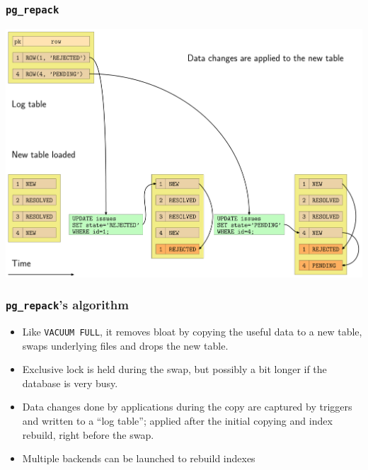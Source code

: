 \begin{frame}
  \frametitle{\texttt{pg\_repack}}
  \begin{center}
    \includegraphics[height=\sizeforimages\textheight]{images/pg_repack_02.png}
  \end{center}
\end{frame}

\begin{frame}
  \frametitle{\texttt{pg\_repack}'s algorithm}
  \begin{itemize}
    \item Like \texttt{VACUUM FULL}, it removes bloat by copying the
      useful data to a new table, swaps underlying files and drops the new
      table.
    \item Exclusive lock is held during the swap, but possibly a bit longer if
      the database is very busy.
    \item Data changes done by applications during the copy are captured by
      triggers and written to a ``log table'';
      applied after the initial copying and index rebuild, right before the swap.
    \item Multiple backends can be launched to rebuild indexes
  \end{itemize}
\end{frame}

